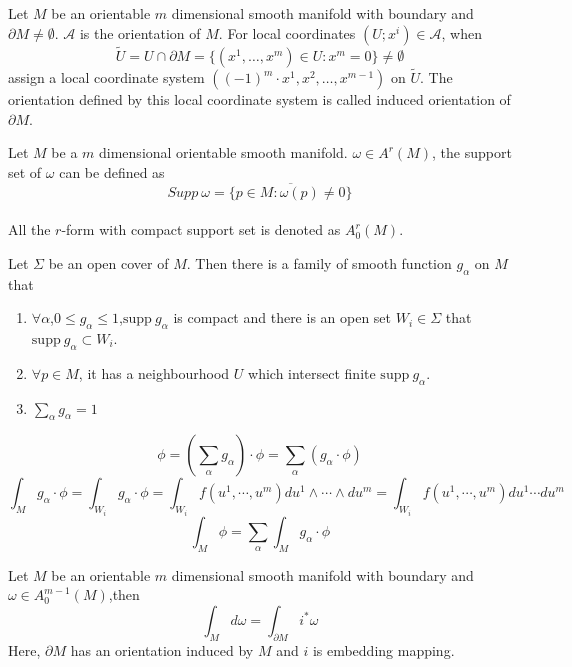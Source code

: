 \begin{newdef} 
Let $M$ be an orientable $m$ dimensional smooth manifold with boundary and $\partial M \neq \emptyset$. $\mathcal{A}$ is the orientation of $M$. For local coordinates $(U;x^i) \in \mathcal{A}$, when 
\[\tilde{U} = U \cap \partial M = \{(x^1,\ldots,x^m) \in U:x^m=0 \} \neq \emptyset\]
assign a local coordinate system $((-1)^m \cdot x^1,x^2,\ldots,x^{m-1})$ on $\tilde{U}$. The orientation defined by this local coordinate system is called induced orientation of $\partial M$.
\end{newdef}

\begin{newdef} 
Let $M$ be a $m$ dimensional orientable smooth manifold. $\omega \in A^r(M)$, the support set of $\omega$ can be defined as
\[Supp \ \omega = \overline {\{ p \in M :\omega(p) \neq 0\}}\]\\
All the $r$-form with compact support set is denoted as $A^r_0(M)$.
\end{newdef}

\begin{newdef}
Let $\Sigma$ be an open cover of $M$. Then there is a family of smooth function $g_{\alpha}$ on $M$ that
\begin{enumerate}
\item $\forall \alpha$,$0 \leq g_{\alpha} \leq 1$,$\mathrm{supp} \ g_{\alpha}$ is compact and there is an open set $W_i \in  \Sigma$ that $\mathrm{supp} \  g_{\alpha} \subset W_i$.
\item $\forall p \in M$, it has a neighbourhood $U$ which intersect finite $\mathrm{supp} \ g_{\alpha}$.
\item $\sum_{\alpha} g_{\alpha} = 1$
\end{enumerate}
\end{newdef}


\begin{newdef}
\[\phi = (\sum_{\alpha} g_{\alpha})\cdot \phi = \sum_{\alpha} (g_{\alpha} \cdot \phi)\]
\[\int_{M} g_{\alpha} \cdot \phi = \int_{W_i} g_{\alpha} \cdot \phi = \int_{W_i} f(u^1,\cdots,u^m) du^1 \wedge \cdots \wedge du^m = \int_{W_i} f(u^1,\cdots,u^m) du^1 \cdots du^m\]
\[\int_{M} \phi = \sum_{\alpha} \int_{M} g_{\alpha} \cdot \phi\]
\end{newdef}

\begin{newthem} 
Let $M$ be an orientable $m$ dimensional smooth manifold with boundary and $\omega \in A_0^{m-1}(M)$,then
\[\int_{M} d\omega = \int_{\partial M} i^* \omega\]
Here, $\partial M$ has an orientation induced by $M$ and $i$ is  embedding mapping.
\end{newthem}

